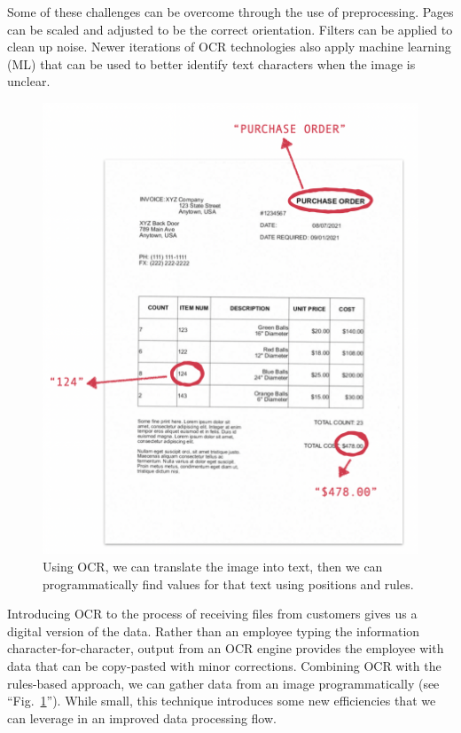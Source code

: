 \documentclass[conference]{IEEEtran}
\begin{document}
Some of these challenges can be overcome through the use of preprocessing. Pages can be scaled and adjusted to be the correct orientation. Filters can be applied to clean up noise. Newer iterations of OCR technologies also apply machine learning (ML) that can be used to better identify text characters when the image is unclear.

\begin{figure}[ht]
\centerline{\includegraphics[width=\columnwidth]{RulesBasedOCR.png}}
\caption{Using OCR, we can translate the image into text, then we can programmatically find values for that text using positions and rules.}
\label{figRulesBasedOCR}
\end{figure}

Introducing OCR to the process of receiving files from customers gives us a digital version of the data. Rather than an employee typing the information character-for-character, output from an OCR engine provides the employee with data that can be copy-pasted with minor corrections. Combining OCR with the rules-based approach, we can gather data from an image programmatically (see ``Fig.~\ref{figRulesBasedOCR}'').  While small, this technique introduces some new efficiencies that we can leverage in an improved data processing flow.
\end{document}
